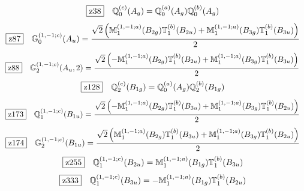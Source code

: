 \documentclass[fleqn,10pt,landscape]{jsarticle}
\begin{document}
\begin{dmath*}
\hspace*{3mm}\fbox{z38}\quad \mathbb{Q}_{0}^{(c)}(A_{g})=\mathbb{Q}_{0}^{(a)}(A_{g}) \mathbb{Q}_{0}^{(b)}(A_{g})
\end{dmath*}
\begin{dmath*}
\hspace*{3mm}\fbox{z87}\quad \mathbb{G}_{0}^{(1,-1;c)}(A_{u})=\frac{\sqrt{2} \left(\mathbb{M}_{1}^{(1,-1;a)}(B_{2g}) \mathbb{T}_{1}^{(b)}(B_{2u}) + \mathbb{M}_{1}^{(1,-1;a)}(B_{3g}) \mathbb{T}_{1}^{(b)}(B_{3u})\right)}{2}
\end{dmath*}
\begin{dmath*}
\hspace*{3mm}\fbox{z88}\quad \mathbb{G}_{2}^{(1,-1;c)}(A_{u},2)=\frac{\sqrt{2} \left(- \mathbb{M}_{1}^{(1,-1;a)}(B_{2g}) \mathbb{T}_{1}^{(b)}(B_{2u}) + \mathbb{M}_{1}^{(1,-1;a)}(B_{3g}) \mathbb{T}_{1}^{(b)}(B_{3u})\right)}{2}
\end{dmath*}
\begin{dmath*}
\hspace*{3mm}\fbox{z128}\quad \mathbb{Q}_{2}^{(c)}(B_{1g})=\mathbb{Q}_{0}^{(a)}(A_{g}) \mathbb{Q}_{2}^{(b)}(B_{1g})
\end{dmath*}
\begin{dmath*}
\hspace*{3mm}\fbox{z173}\quad \mathbb{Q}_{1}^{(1,-1;c)}(B_{1u})=\frac{\sqrt{2} \left(- \mathbb{M}_{1}^{(1,-1;a)}(B_{2g}) \mathbb{T}_{1}^{(b)}(B_{3u}) + \mathbb{M}_{1}^{(1,-1;a)}(B_{3g}) \mathbb{T}_{1}^{(b)}(B_{2u})\right)}{2}
\end{dmath*}
\begin{dmath*}
\hspace*{3mm}\fbox{z174}\quad \mathbb{G}_{2}^{(1,-1;c)}(B_{1u})=\frac{\sqrt{2} \left(\mathbb{M}_{1}^{(1,-1;a)}(B_{2g}) \mathbb{T}_{1}^{(b)}(B_{3u}) + \mathbb{M}_{1}^{(1,-1;a)}(B_{3g}) \mathbb{T}_{1}^{(b)}(B_{2u})\right)}{2}
\end{dmath*}
\begin{dmath*}
\hspace*{3mm}\fbox{z255}\quad \mathbb{Q}_{1}^{(1,-1;c)}(B_{2u})=\mathbb{M}_{1}^{(1,-1;a)}(B_{1g}) \mathbb{T}_{1}^{(b)}(B_{3u})
\end{dmath*}
\begin{dmath*}
\hspace*{3mm}\fbox{z333}\quad \mathbb{Q}_{1}^{(1,-1;c)}(B_{3u})=- \mathbb{M}_{1}^{(1,-1;a)}(B_{1g}) \mathbb{T}_{1}^{(b)}(B_{2u})
\end{dmath*}
\vspace{5mm}
\end{document}
